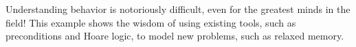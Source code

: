 Understanding \oota{} behavior is notoriously difficult, even for the
greatest minds in the field!  %
This example shows the wisdom of using existing tools, such as preconditions
and Hoare logic, to model new problems, such as relaxed memory.

\begin{comment}
  \color{red} Need to sort this out.
  Alan proposes:
\begin{verbatim}
     (W y 2) => <>(R x 1)
     (W y 1) => <>(R x 0)
     (W x 1) => <>(R y 1)
   <>(W x 1) => not(<>(W x 2))  --- which should be???  <>(W x 0) => not(<>(W x 1))
\end{verbatim}

  2020/09/30: This seems to go bad because of initialization...
  The formula
\begin{verbatim}
<>Wx0 => not(<>Wx1)
\end{verbatim}
  does not hold for
\begin{verbatim}
x=0; x=y
\end{verbatim}

  2020/09/10:  I am worried about the compositionality of this predicate:
\begin{verbatim}
I think
   <>(W x 0 => not(<>(W x 1)))
holds for 
   x=0; r=y 
and
   x=1
but not
   x=0; r=y || x=1
as shown by the execution
   Wx1 < Wx0 < Ry0
\end{verbatim}
  
  It is impossible to fulfill $(\DR{y}{1})$ in the following
  \cite[RNG]{DBLP:conf/esop/SvendsenPDLV18}:
  \begin{align*}
    \taglabel{OOTA5}
    ( \PW{y}{x{+}1}
    \PAR
    \PW{x}{y} ) && \hbox{\begin{tikzinline}[node distance=1.5em]
        \event{rx}{\DR{x}{1}}{}
        \event{wy}{\DW{y}{2}}{right=of rx}
        \po{rx}{wy}
        \event{ry}{\DR{y}{1}}{right=3em of wy}
        \event{wx}{\DW{x}{1}}{right=of ry}
        \po{ry}{wx}
        \rf[out=170,in=10]{wx}{rx}
      \end{tikzinline}}
  \end{align*}
  The proof proceeds as before, starting with the following invariant:
  \begin{gather*}
    [\DW{y}{2} \Rightarrow \once\DR{x}{1}] \land
    [\once\DW{x}{1} \Rightarrow \once\DR{y}{1}] \land
    [\once\DW{y}{1} \Rightarrow \once\DR{x}{0}] \land
    [\once\DW{x}{0} \Rightarrow \lnot(\once\DW{x}{1})]
  \end{gather*}
\begin{verbatim}
  Wy2 => <>Rx1  /\  <>Wx1 => <>Ry1  /\  <>Wy1 => <>Rx0  
close x and y                                          
  Wy2 => <>Wx1  /\  <>Wx1 => <>Wy1  /\  <>Wy1 => <>Wx0  
chain
  Wy1 => <>Wx0  
chain with <>Wx0 => not(<>Wx1)
\end{verbatim}
\end{comment}
